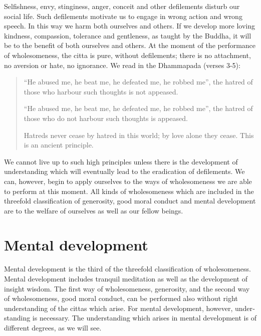 \documentclass{book}
\begin{document}
Selfishness, envy, stinginess, anger, conceit and other defilements
disturb our social life. Such defilements motivate us to engage in wrong
action and wrong speech. In this way we harm both ourselves and others.
If we develop more loving kindness, compassion, tolerance and gentleness, as taught by the Buddha, it will be to the benefit of both ourselves and others. At the moment of the performance of wholesomeness, the citta is pure, without defilements; there is no attachment, no aversion or hate,   no ignorance.
We read in the Dhammapada (verses 3-5):

\begin{quote}
``He abused me, he beat me, he defeated me, he robbed me'', the hatred
of those who harbour such thoughts is not appeased.

``He abused me, he beat me, he defeated me, he robbed me'', the hatred
of those who do not harbour such thoughts is appeased.

Hatreds never cease by hatred in this world; by love alone they cease.
This is an ancient principle.
\end{quote}

We cannot live up to such high principles unless there is the
development of understanding which will eventually lead to the
eradication of defilements. We can, however, begin to apply ourselves to
the ways of whole­some­ness we are able to perform at this moment. All
kinds of wholesomeness which are included in the threefold
classification of generosity, good moral conduct and mental development
are to the welfare of ourselves as well as our fellow beings.

\chapter{Mental development}

Mental development is the third of the threefold clas­sification of
wholesomeness. Mental development includes tranquil meditation as well
as the development of insight wisdom. The first way of wholesomeness,
generosity, and the second way of whole­some­ness, good moral conduct,
can be performed also without right understanding of the cittas which arise. For mental develop­ment, however, under­standing is necessary. 
The under­standing which arises in mental development is of different degrees, as we will see.
\end{document}

